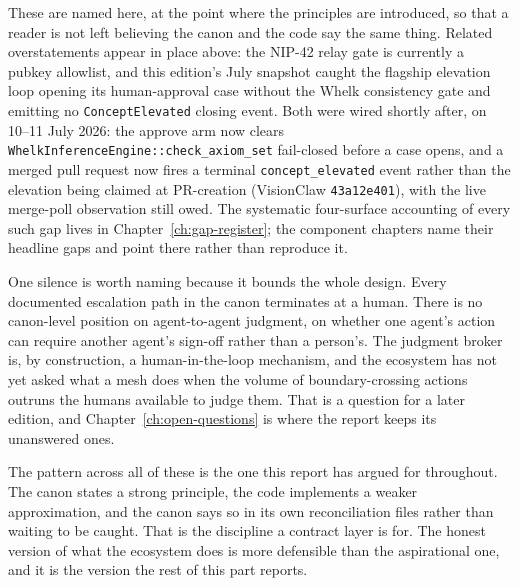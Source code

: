 These are named here, at the point where the principles are introduced, so that a reader is not left believing the canon and the code say the same thing. Related overstatements appear in place above: the NIP-42 relay gate is currently a pubkey allowlist, and this edition's July snapshot caught the flagship elevation loop opening its human-approval case without the Whelk consistency gate and emitting no \texttt{ConceptElevated} closing event. Both were wired shortly after, on 10--11 July 2026: the approve arm now clears \texttt{WhelkInferenceEngine::check\_axiom\_set} fail-closed before a case opens, and a merged pull request now fires a terminal \texttt{concept\_elevated} event rather than the elevation being claimed at PR-creation (VisionClaw \texttt{43a12e401}), with the live merge-poll observation still owed. The systematic four-surface accounting of every such gap lives in Chapter~\ref{ch:gap-register}; the component chapters name their headline gaps and point there rather than reproduce it.

One silence is worth naming because it bounds the whole design. Every documented escalation path in the canon terminates at a human. There is no canon-level position on agent-to-agent judgment, on whether one agent's action can require another agent's sign-off rather than a person's. The judgment broker is, by construction, a human-in-the-loop mechanism, and the ecosystem has not yet asked what a mesh does when the volume of boundary-crossing actions outruns the humans available to judge them. That is a question for a later edition, and Chapter~\ref{ch:open-questions} is where the report keeps its unanswered ones.

The pattern across all of these is the one this report has argued for throughout. The canon states a strong principle, the code implements a weaker approximation, and the canon says so in its own reconciliation files rather than waiting to be caught. That is the discipline a contract layer is for. The honest version of what the ecosystem does is more defensible than the aspirational one, and it is the version the rest of this part reports.

